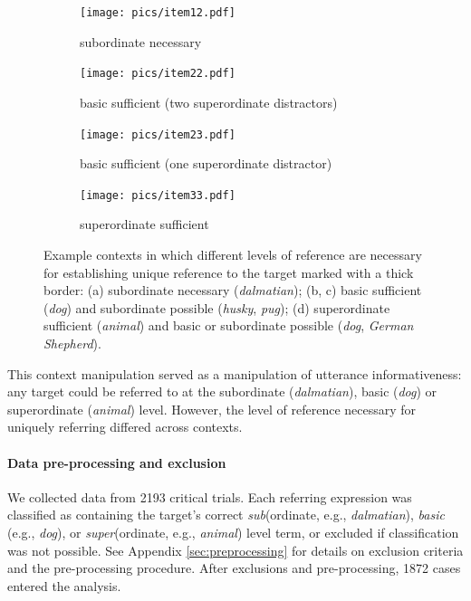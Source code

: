\documentclass[11pt]{article}
\newcommand{\appref}[1]{Appendix \ref{#1}}
\begin{document}
\begin{figure}
	\begin{subfigure}{.5\textwidth}
		\centering
		\texttt{[image: pics/item12.pdf]}
		\caption{subordinate necessary}
		\label{fig:item12}
	\end{subfigure}
	\begin{subfigure}{.5\textwidth}
		\centering
		\texttt{[image: pics/item22.pdf]}
		\centering
		\caption{basic sufficient (two superordinate distractors)}
		\label{fig:item22}
	\end{subfigure}
	\begin{subfigure}{.5\textwidth}
		\centering
		\texttt{[image: pics/item23.pdf]}
		\caption{basic sufficient (one superordinate distractor)}
		\label{fig:item23}
	\end{subfigure}
	\begin{subfigure}{.5\textwidth}
		\centering
		\texttt{[image: pics/item33.pdf]}
		\centering
		\caption{superordinate sufficient}
		\label{fig:item33}
	\end{subfigure}
	\caption{Example contexts in which different levels of reference are necessary for establishing unique reference to the target marked with a thick border: (a) subordinate necessary (\emph{dalmatian}); (b, c) basic sufficient (\emph{dog}) and subordinate possible (\emph{husky}, \emph{pug}); (d) superordinate sufficient (\emph{animal}) and basic or subordinate possible (\emph{dog}, \emph{German Shepherd}).}
	\label{fig:dogcontexts}
\end{figure}

This context manipulation served as a manipulation of utterance informativeness: any target could be referred to at the subordinate (\emph{dalmatian}), basic (\emph{dog}) or superordinate (\emph{animal}) level. However, the level of reference necessary for uniquely referring differed across contexts.


\paragraph{Data pre-processing and exclusion}

We collected data from 2193 critical trials. Each referring expression was classified as containing the  target's correct \emph{sub}(ordinate, e.g., \emph{dalmatian}), \emph{basic} (e.g., \emph{dog}), or \emph{super}(ordinate, e.g., \emph{animal}) level term, or excluded if classification was not possible. See \appref{sec:preprocessing} for details on exclusion criteria and the pre-processing procedure.  After exclusions and pre-processing, 1872 cases entered the analysis.
\end{document}
